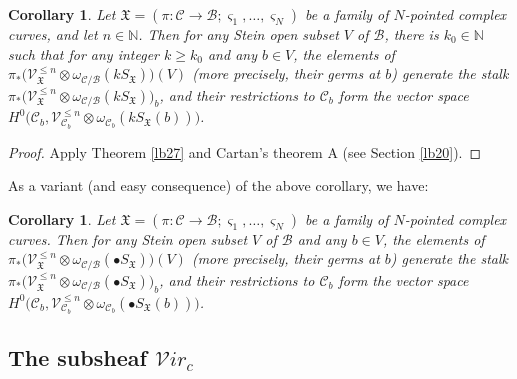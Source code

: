 \documentclass[12pt,b5paper,notitlepage]{report}
\theoremstyle{definition}
\theoremstyle{plain}
\newtheorem{co}[df]{Corollary}
\newcommand{\fk}{\mathfrak}
\newcommand{\mc}{\mathcal}
\newcommand{\scr}{\mathscr}
\newcommand{\sgm}{\varsigma}
\newcommand{\SX}{S_{\fk X}}
\newcommand{\blt}{\bullet}
\newcommand{\Nbb}{\mathbb N}
\newcommand{\svir}{\mathcal V\!\mathit{ir}}
\numberwithin{equation}{section}
\begin{document}
\begin{co}
Let $\fk X=(\pi:\mc C\rightarrow\mc B;\sgm_1,\dots,\sgm_N)$ be a family of $N$-pointed complex curves, and let $n\in\Nbb$. Then for any  Stein open subset $V$ of $\mc B$, there is $k_0\in\Nbb$ such that for  any integer $k\geq k_0$ and any $b\in V$,   the elements of $\pi_*\big(\scr V_{\fk X}^{\leq n}\otimes\omega_{\mc C/\mc B}(k\SX)\big)(V)$ (more precisely, their germs at $b$) generate the stalk $\pi_*\big(\scr V_{\fk X}^{\leq n}\otimes\omega_{\mc C/\mc B}(k\SX)\big)_b$, and their restrictions to $\mc C_b$ form the vector space $H^0\big(\mc C_b,\scr V_{\mc C_b}^{\leq n}\otimes\omega_{\mc C_b}(k\SX(b))\big)$.
\end{co}

\begin{proof}
Apply Theorem \ref{lb27}  and Cartan's theorem A (see Section \ref{lb20}). 
\end{proof}

As a variant (and easy consequence) of the above corollary, we have:

\begin{co}\label{lb33}
Let $\fk X=(\pi:\mc C\rightarrow\mc B;\sgm_1,\dots,\sgm_N)$ be a family of $N$-pointed complex curves. Then for any  Stein open subset $V$ of $\mc B$ and any $b\in V$, the elements of $\pi_*\big(\scr V_{\fk X}^{\leq n}\otimes\omega_{\mc C/\mc B}(\blt\SX)\big)(V)$ (more precisely, their germs at $b$) generate the stalk $\pi_*\big(\scr V_{\fk X}^{\leq n}\otimes\omega_{\mc C/\mc B}(\blt\SX)\big)_b$, and their restrictions to $\mc C_b$ form the vector space $H^0\big(\mc C_b,\scr V_{\mc C_b}^{\leq n}\otimes\omega_{\mc C_b}(\blt\SX(b))\big)$.
\end{co}


\subsection*{The subsheaf $\svir_c$}
\end{document}
